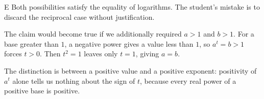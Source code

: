 \documentclass[11pt,a4paper]{article}
\begin{document}
\begin{enumerate}[label=\textbf{\arabic*.},leftmargin=*,itemsep=0pt,start=12]
\begin{djsSolution}{E}
Both possibilities satisfy the equality of logarithms. The student's mistake is to discard the reciprocal case without justification.

The claim would become true if we additionally required $a>1$ and $b>1$. For a base greater than $1$, a negative power gives a value less than $1$, so $a^t=b>1$ forces $t>0$. Then $t^2=1$ leaves only $t=1$, giving $a=b$.

The distinction is between a positive value and a positive exponent: positivity of $a^t$ alone tells us nothing about the sign of $t$, because every real power of a positive base is positive.
\end{djsSolution}
\end{enumerate}
\clearpage
\thispagestyle{djssolutions}
\vspace*{8pt}
\end{document}
